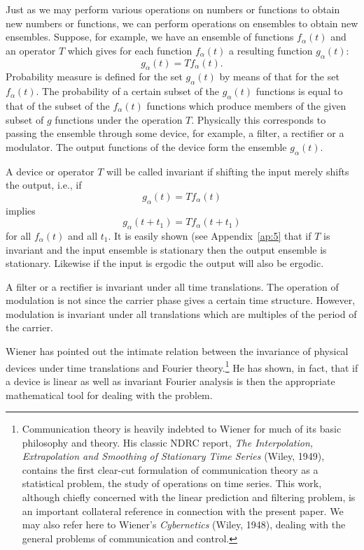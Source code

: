 Just as we may perform various operations on numbers or functions to obtain
new numbers or functions, we can perform operations on ensembles to obtain
new ensembles.  Suppose, for example, we have an ensemble of functions
$f_\alpha(t)$ and an operator $T$ which gives for each function
$f_\alpha(t)$ a resulting function $g_\alpha(t)$:
$$
g_\alpha(t)=Tf_\alpha(t).
$$
Probability measure is defined for the set $g_\alpha(t)$ by means of that
for the set $f_\alpha(t)$.  The probability of a certain subset of the
$g_\alpha(t)$ functions is equal to that of the subset of the $f_\alpha(t)$
functions which produce members of the given subset of $g$ functions under
the operation $T$.  Physically this corresponds to passing the ensemble
through some device, for example, a filter, a rectifier or a modulator.
The output functions of the device form the ensemble $g_\alpha(t)$.

A device or operator $T$ will be called invariant if shifting the input
merely shifts the output, i.e., if
$$
g_\alpha(t)=Tf_\alpha(t)
$$
implies
$$
g_\alpha(t+t_1)=Tf_\alpha(t+t_1)
$$
for all $f_\alpha(t)$ and all $t_1$.  It is easily shown (see
Appendix~\ref{ap:5} that if $T$ is invariant
and the input ensemble is stationary then the output ensemble is
stationary.  Likewise if the input is ergodic the output will also be
ergodic.

A filter or a rectifier is invariant under all time translations.  The
operation of modulation is not since the carrier
phase gives a certain time structure.  However, modulation is invariant
under all translations which are multiples of the period of the carrier.

Wiener has pointed out the intimate relation between the invariance of
physical devices under time translations and Fourier
theory.\footnote{Communication theory is heavily indebted to Wiener for
much of its basic philosophy and theory.  His classic NDRC report, {\it The
Interpolation, Extrapolation and Smoothing of Stationary Time Series}
(Wiley, 1949), contains the first clear-cut formulation of communication
theory as a statistical problem, the study of operations on time series.
This work, although chiefly concerned with the linear prediction and
filtering problem, is an important collateral reference in connection with
the present paper.  We may also refer here to Wiener's {\it Cybernetics}
(Wiley, 1948), dealing with the general problems of communication and
control.} He has shown, in fact, that if a device is linear as well as
invariant Fourier analysis is then the appropriate mathematical tool for
dealing with the problem.

